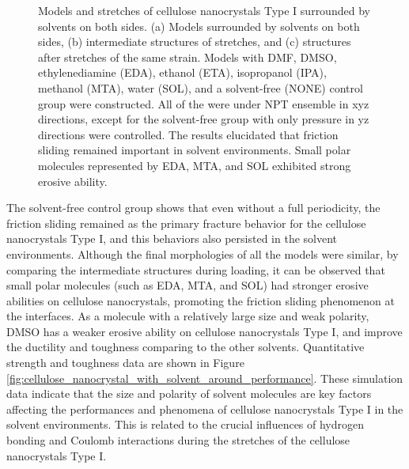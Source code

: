 \documentclass{article}
\begin{document}
\begin{figure}[htbp]
\begin{subfigure}[b]{0.96\textwidth}
        \subcaption{}
    \end{subfigure}
    \captionsetup{font=scriptsize}
    \caption{
    Models and stretches of cellulose nanocrystals Type I surrounded by solvents on both sides.
    (a) Models surrounded by solvents on both sides, (b) intermediate structures of stretches, and (c) structures after stretches of the same strain.
    Models with DMF, DMSO, ethylenediamine (EDA), ethanol (ETA), isopropanol (IPA), methanol (MTA), water (SOL), and a solvent-free (NONE) control group were constructed.
    All of the were under NPT ensemble in xyz directions, except for the solvent-free group with only pressure in yz directions were controlled.
    The results elucidated that friction sliding remained important in solvent environments.
    Small polar molecules represented by EDA, MTA, and SOL exhibited strong erosive ability.
    }
    \label{fig:cellulose_nanocrystal_with_solvent_around_fractures}
\end{figure}

The solvent-free control group shows that even without a full periodicity, the friction sliding remained as the primary fracture behavior for the cellulose nanocrystals Type I, and this behaviors also persisted in the solvent environments.
Although the final morphologies of all the models were similar, by comparing the intermediate structures during loading,
it can be observed that small polar molecules (such as EDA, MTA, and SOL) had stronger erosive abilities on cellulose nanocrystals, promoting the friction sliding phenomenon at the interfaces.
As a molecule with a relatively large size and weak polarity, DMSO has a weaker erosive ability on cellulose nanocrystals Type I, and improve the ductility and toughness comparing to the other solvents.
Quantitative strength and toughness data are shown in Figure \ref{fig:cellulose_nanocrystal_with_solvent_around_performance}.
These simulation data indicate that the size and polarity of solvent molecules are key factors affecting the performances and phenomena of cellulose nanocrystals Type I in the solvent environments.
This is related to the crucial influences of hydrogen bonding and Coulomb interactions during the stretches of the cellulose nanocrystals Type I.
\end{document}
